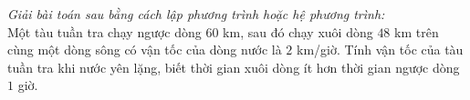 \begin{ex}%
	\textit{Giải bài toán sau bằng cách lập phương trình hoặc hệ phương trình:}\\
	Một tàu tuần tra chạy ngược dòng $ 60 $ km, sau đó chạy xuôi dòng $ 48 $ km trên cùng một dòng sông có vận tốc của dòng nước là $ 2 $ km/giờ. Tính vận tốc của tàu tuần tra khi nước yên lặng, biết thời gian xuôi dòng ít hơn thời gian ngược dòng $ 1 $ giờ.
\end{ex}  

